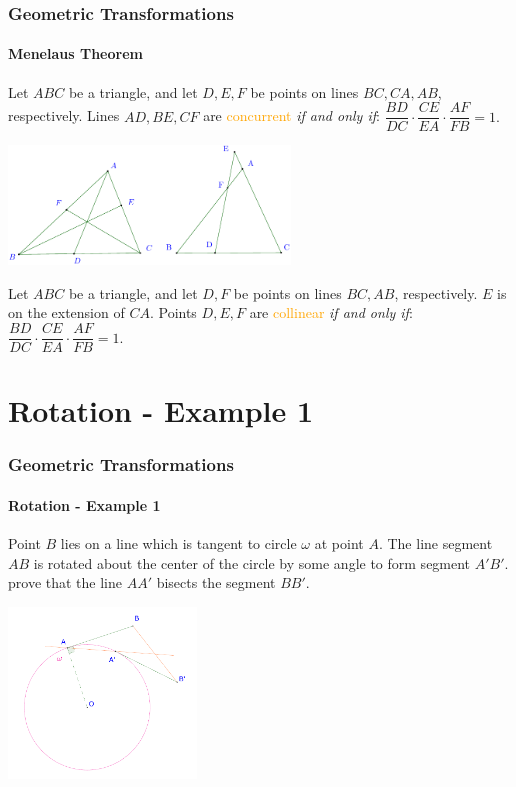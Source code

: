 \documentclass[8pt,xcolor=table,dvipsnames]{beamer}
\begin{document}
\begin{frame}[t]
    \frametitle{Geometric Transformations}
    \framesubtitle{Menelaus Theorem}
    \begin{theorem}
        Let $ABC$ be a triangle, and let $D, E, F$ be points on lines $BC, CA, AB$, respectively.
        Lines $AD, BE, CF$ are \textcolor{orange}{concurrent} \textit{if and only if}:
        $\dfrac{BD}{DC} \cdot \dfrac{CE}{EA}\cdot \dfrac{AF}{FB} = 1.$
    \end{theorem}
    \begin{center}
        \includegraphics[width=7.5cm]{./svg/pdf/ceva-menelaus.pdf}
    \end{center}
    \begin{theorem}
        Let $ABC$ be a triangle, and let $D,F$ be points on lines $BC,AB$, respectively.
        $E$ is on the extension of $CA$.
        Points $D, E, F$ are \textcolor{orange}{collinear} \textit{if and only if}:
        $\dfrac{BD}{DC} \cdot \dfrac{CE}{EA}\cdot \dfrac{AF}{FB} = 1.$
    \end{theorem}
\end{frame}

\section{Rotation - Example 1}

\begin{frame}[t]
    \frametitle{Geometric Transformations}
    \framesubtitle{Rotation - Example 1}
    \begin{example}
        Point $B$ lies on a line which is tangent to circle $\omega$ at point $A.$
        The line segment $AB$ is rotated about the center of the circle by some angle to form segment $A'B'.$
        prove that the line $AA'$ bisects the segment $BB'.$
    \end{example}

    \bigbreak
    \begin{center}
        \includegraphics[width=5cm]{./svg/pdf/sc-23-hs-3-p7.pdf}
    \end{center}
\end{frame}
\end{document}
